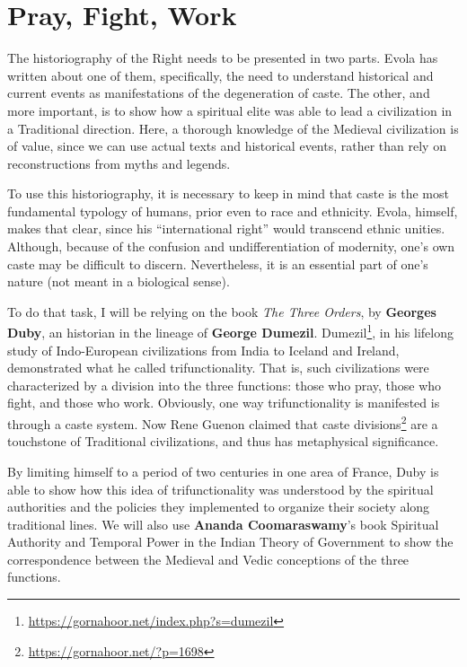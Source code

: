 \section{Pray, Fight, Work}

The historiography of the Right needs to be presented in two parts. Evola has written about one of them, specifically, the need to understand historical and current events as manifestations of the degeneration of caste. The other, and more important, is to show how a spiritual elite was able to lead a civilization in a Traditional direction. Here, a thorough knowledge of the Medieval civilization is of value, since we can use actual texts and historical events, rather than rely on reconstructions from myths and legends.

To use this historiography, it is necessary to keep in mind that caste is the most fundamental typology of humans, prior even to race and ethnicity. Evola, himself, makes that clear, since his ``international right'' would transcend ethnic unities. Although, because of the confusion and undifferentiation of modernity, one's own caste may be difficult to discern. Nevertheless, it is an essential part of one's nature (not meant in a biological sense).

To do that task, I will be relying on the book \textit{The Three Orders}, by \textbf{Georges Duby}, an historian in the lineage of \textbf{George Dumezil}. Dumezil\footnote{\url{https://gornahoor.net/index.php?s=dumezil}}, in his lifelong study of Indo-European civilizations from India to Iceland and Ireland, demonstrated what he called trifunctionality. That is, such civilizations were characterized by a division into the three functions: those who pray, those who fight, and those who work. Obviously, one way trifunctionality is manifested is through a caste system. Now Rene Guenon claimed that caste divisions\footnote{\url{https://gornahoor.net/?p=1698}} are a touchstone of Traditional civilizations, and thus has metaphysical significance.

By limiting himself to a period of two centuries in one area of France, Duby is able to show how this idea of trifunctionality was understood by the spiritual authorities and the policies they implemented to organize their society along traditional lines. We will also use \textbf{Ananda Coomaraswamy}'s book Spiritual Authority and Temporal Power in the Indian Theory of Government to show the correspondence between the Medieval and Vedic conceptions of the three functions.

